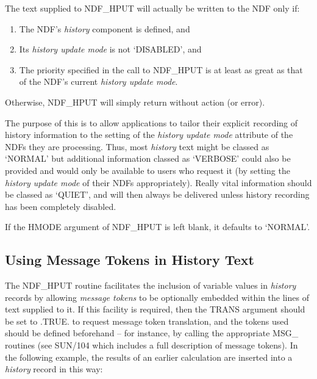 \documentclass[twoside,11pt]{article}
\newcommand{\htmlref}[2]{#1}
\newcommand{\xref}[3]{#1}
\newcommand{\xlabel}[1]{}
\newcommand{\st}[1]{{\em{#1}}}
\begin{document}
The text supplied to NDF\_HPUT will actually be written to the NDF
only if:

\begin{enumerate}

\item The NDF's \st{history\/} component is defined, and

\item Its \st{history update mode\/} is not `DISABLED', and

\item The priority specified in the call to NDF\_HPUT is at least as great as
that of the NDF's current \st{history update mode}.

\end{enumerate}

Otherwise, NDF\_HPUT will simply return without action (or error).

The purpose of this is to allow applications to tailor their explicit
recording of history information to the setting of the \st{history
update mode\/} attribute of the NDFs they are processing.  Thus, most
\st{history\/} text might be classed as `NORMAL' but additional information
classed as `VERBOSE' could also be provided and would only be
available to users who request it (by setting the \st{history update
mode\/} of their NDFs appropriately).  Really vital information should
be classed as `QUIET', and will then always be delivered unless
history recording has been completely disabled.

If the HMODE argument of NDF\_HPUT is left blank, it defaults to
`NORMAL'.

\subsection{\xlabel{using_message_tokens_in_history_text}Using Message Tokens in History Text}

The \htmlref{NDF\_HPUT}{NDF_HPUT} routine facilitates the inclusion of variable values in
\st{history\/} records by allowing \st{message tokens\/} to be optionally
embedded within the lines of text supplied to it. If this facility is
required, then the TRANS argument should be set to .TRUE. to request
message token translation, and the tokens used should be defined
beforehand -- for instance, by calling the appropriate MSG\_ routines
(see \xref{SUN/104}{sun104}{msg} which includes a full description of
message tokens). In the following example, the results of an earlier
calculation are inserted into a \st{history\/} record in this way:
\end{document}
